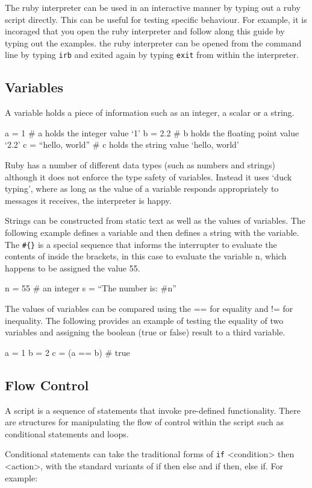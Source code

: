 The ruby interpreter can be used in an interactive manner by typing out a ruby script directly. This can be useful for testing specific behaviour. For example, it is incoraged that you open the ruby interpreter and follow along this guide by typing out the examples. the ruby interpreter can be opened from the command line by typing \texttt{irb} and exited again by typing \texttt{exit} from within the interpreter.

\subsection{Variables}
A variable holds a piece of information such as an integer, a scalar or a string.

a = 1    # a holds the integer value `1'
b = 2.2  # b holds the floating point value `2.2'
c = ``hello, world'' # c holds the string value `hello, world'

Ruby has a number of different data types (such as numbers and strings) although it does not enforce the type safety of variables. Instead it uses `duck typing', where as long as the value of a variable responds appropriately to messages it receives, the interpreter is happy.

Strings can be constructed from static text as well as the values of variables. The following example defines a variable and then defines a string with the variable. The \texttt{\#\{\}} is a special sequence that informs the interrupter to evaluate the contents of inside the brackets, in this case to evaluate the variable n, which happens to be assigned the value 55.

n = 55 # an integer 
s = ``The number is: #{n}''

The values of variables can be compared using the == for equality and != for inequality. The following provides an example of testing the equality of two variables and assigning the boolean (true or false) result to a third variable.

a = 1
b = 2
c = (a == b) # true

\subsection{Flow Control}
A script is a sequence of statements that invoke pre-defined functionality. There are structures for manipulating the flow of control within the script such as conditional statements and loops.

Conditional statements can take the traditional forms of \texttt{if} <condition> then <action>, with the standard variants of if then else and if then, else if. For example:

